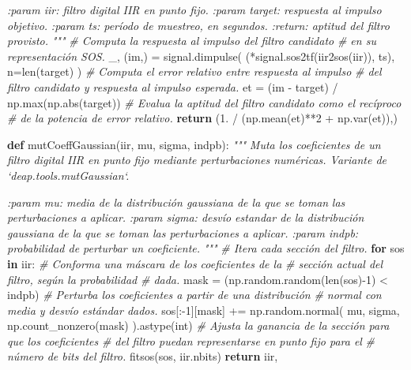 \documentclass[11pt]{article}
\newenvironment{Shaded}{}{}
\newcommand{\KeywordTok}[1]{\textcolor[rgb]{0.00,0.44,0.13}{\textbf{{#1}}}}
\newcommand{\DecValTok}[1]{\textcolor[rgb]{0.25,0.63,0.44}{{#1}}}
\newcommand{\FloatTok}[1]{\textcolor[rgb]{0.25,0.63,0.44}{{#1}}}
\newcommand{\CommentTok}[1]{\textcolor[rgb]{0.38,0.63,0.69}{\textit{{#1}}}}
\newcommand{\NormalTok}[1]{{#1}}
\newcommand{\ControlFlowTok}[1]{\textcolor[rgb]{0.00,0.44,0.13}{\textbf{{#1}}}}
\newcommand{\OperatorTok}[1]{\textcolor[rgb]{0.40,0.40,0.40}{{#1}}}
\newcommand{\BuiltInTok}[1]{{#1}}
\begin{document}
\begin{Shaded}
\begin{Highlighting}[]
{\CommentTok{    :param iir: filtro digital IIR en punto fijo.}
\CommentTok{    :param target: respuesta al impulso objetivo.}
\CommentTok{    :param ts: período de muestreo, en segundos.}
\CommentTok{    :return: aptitud del filtro provisto.}
\CommentTok{    """}
    \CommentTok{# Computa la respuesta al impulso del filtro candidato}
    \CommentTok{# en su representación SOS.}
\NormalTok{    _, (im,) }\OperatorTok{=}\NormalTok{ signal.dimpulse(}
\NormalTok{        (}\OperatorTok{*}\NormalTok{signal.sos2tf(iir2sos(iir)), ts), n}\OperatorTok{=}\BuiltInTok{len}\NormalTok{(target)}
\NormalTok{    )}
    \CommentTok{# Computa el error relativo entre respuesta al impulso}
    \CommentTok{# del filtro candidato y respuesta al impulso esperada.}
\NormalTok{    et }\OperatorTok{=}\NormalTok{ (im }\OperatorTok{-}\NormalTok{ target) }\OperatorTok{/}\NormalTok{ np.}\BuiltInTok{max}\NormalTok{(np.}\BuiltInTok{abs}\NormalTok{(target))}
    \CommentTok{# Evalua la aptitud del filtro candidato como el recíproco}
    \CommentTok{# de la potencia de error relativo.}
    \ControlFlowTok{return}\NormalTok{ (}\FloatTok{1.} \OperatorTok{/}\NormalTok{ (np.mean(et)}\OperatorTok{**}\DecValTok{2} \OperatorTok{+}\NormalTok{ np.var(et)),)}


\KeywordTok{def}\NormalTok{ mutCoeffGaussian(iir, mu, sigma, indpb):}
    \CommentTok{"""}
\CommentTok{    Muta los coeficientes de un filtro digital IIR en punto}
\CommentTok{    fijo mediante perturbaciones numéricas. Variante de}
\CommentTok{    `deap.tools.mutGaussian`.}

\CommentTok{    :param mu: media de la distribución gaussiana de la que se toman}
\CommentTok{       las perturbaciones a aplicar.}
\CommentTok{    :param sigma: desvío estandar de la distribución gaussiana de la}
\CommentTok{       que se toman las perturbaciones a aplicar.}
\CommentTok{    :param indpb: probabilidad de perturbar un coeficiente.}
\CommentTok{    """}
    \CommentTok{# Itera cada sección del filtro.}
    \ControlFlowTok{for}\NormalTok{ sos }\KeywordTok{in}\NormalTok{ iir:}
        \CommentTok{# Conforma una máscara de los coeficientes de la}
        \CommentTok{# sección actual del filtro, según la probabilidad}
        \CommentTok{# dada.}
\NormalTok{        mask }\OperatorTok{=}\NormalTok{ (np.random.random(}\BuiltInTok{len}\NormalTok{(sos)}\OperatorTok{-}\DecValTok{1}\NormalTok{) }\OperatorTok{<}\NormalTok{ indpb)}
        \CommentTok{# Perturba los coeficientes a partir de una distribución}
        \CommentTok{# normal con media y desvío estándar dados.}
\NormalTok{        sos[:}\OperatorTok{-}\DecValTok{1}\NormalTok{][mask] }\OperatorTok{+=}\NormalTok{ np.random.normal(}
\NormalTok{            mu, sigma, np.count_nonzero(mask)}
\NormalTok{        ).astype(}\BuiltInTok{int}\NormalTok{)}
        \CommentTok{# Ajusta la ganancia de la sección para que los coeficientes}
        \CommentTok{# del filtro puedan representarse en punto fijo para el}
        \CommentTok{# número de bits del filtro.}
\NormalTok{        fitsos(sos, iir.nbits)}
    \ControlFlowTok{return}\NormalTok{ iir,}


}
\end{Highlighting}
\end{Shaded}
\end{document}
